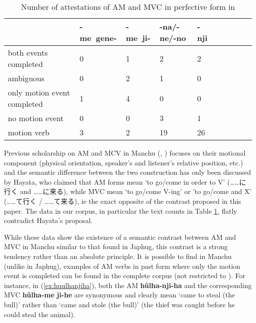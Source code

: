 \documentclass{article}
\newcommand{\ipa}[1]{\textbf{{\phon\mbox{#1}}}} %
\newcommand{\zh}[1]{{\cn#1}}
\begin{document}
\begin{table}[h]
\caption{Number of attestations of AM and MVC in perfective form in \citet{cosmo06dzengseo} } \centering \label{tab:counts.dzengsheo}
\begin{tabular}{llllllllll}
\toprule
 & 	\ipa{-me gene-} & 	\ipa{-me ji-} & 	\ipa{-na/-ne/-no} & 	\ipa{-nji} & 	\\
 \midrule
both events completed & 	0 & 	1 & 	2 & 	2 & 	\\
ambiguous & 	0 & 	2 & 	1 & 	0 & 	\\
only motion event completed & 	1 & 	4 & 	0 & 	0 & 	\\
no motion event & 	0 & 	0 & 	3 & 	1 & 	\\
motion verb & 	3 & 	2 & 	19 & 	26 & 	\\
\bottomrule
\end{tabular}
\end{table}


Previous scholarship on AM and MCV in Manchu (\citealt{hayata95yuku}, \citealt{kubo97come}) focuses on their motional component (physical orientation, speaker’s and listener’s relative position, etc.) and the semantic difference between the two construction has only been discussed by Hayata, who claimed that AM forms mean ‘to go/come in order to V’ (\zh{……に行く} and \zh{……に来る}), while MVC mean ‘to go/come V-ing’ or 'to go/come and X' (\zh{……て行く} / \zh{……て来る}), ie the exact opposite of the contrast proposed in this paper. The data in our corpus, in particular the text counts in Table \ref{tab:counts.dzengsheo}, flatly contradict Hayata's proposal.

While these data show the existence of a semantic contrast between AM and MVC in Manchu similar to that found in Japhug, this contrast is a strong tendency rather than an absolute principle. It is possible to find in Manchu (unlike in Japhug), examples of AM verbs in past form where only the motion event is completed can be found in the complete corpus (not restricted to \citet{cosmo06dzengseo}). For instance,  in (\ref{ex:huulhanjiha}), both the AM \ipa{hûlha-nji-ha} and the corresponding MVC \ipa{hûlha-me} \ipa{ji-he} are synonymous and clearly mean `came to steal (the bull)' rather than `came and stole (the bull)' (the thief was caught before he could steal the animal).
\end{document}
